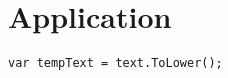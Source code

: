 \section{Application}

\begin{lstlisting}[style=CSharpstyle]
var tempText = text.ToLower();
\end{lstlisting}

